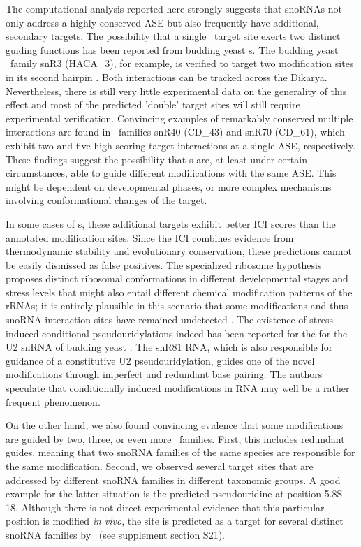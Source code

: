 The computational analysis reported here strongly suggests that
snoRNAs not only address a highly conserved ASE but also frequently
have additional, secondary targets. The possibility that a single
\sno\ target site exerts two distinct guiding functions has been
reported from budding yeast \haca s. The budding yeast \sno\ family
snR3 (HACA\_3), for example, is verified to target two modification
sites in its second hairpin \cite{Schattner:2004}.  Both interactions
can be tracked across the Dikarya.  Nevertheless, there is still very
little experimental data on the generality of this effect and most of
the predicted 'double' target sites will still require experimental
verification. Convincing examples of remarkably conserved multiple
interactions are found in \cd\ families snR40 (CD\_43) and snR70
(CD\_61), which exhibit two and five high-scoring target-interactions
at a single ASE, respectively.  These findings suggest the possibility
that \sno s are, at least under certain circumstances, able to guide
different modifications with the same ASE. This might be dependent on
developmental phases, or more complex mechanisms involving
conformational changes of the target.

In some cases of \haca s, these additional targets exhibit better ICI
scores than the annotated modification sites. Since the ICI combines
evidence from thermodynamic stability and evolutionary conservation, these
predictions cannot be easily dismissed as false positives. The specialized
ribosome hypothesis proposes distinct ribosomal conformations in different
developmental stages and stress levels that might also entail different
chemical modification patterns of the rRNAs; it is entirely plausible in
this scenario that some modifications and thus snoRNA interaction sites
have remained undetected \citep{Xue:2012}. The existence of
stress-induced conditional pseudouridylations indeed has been reported for
the for the U2 snRNA of budding yeast \cite{Wu:2011}. The snR81 RNA, which
is also responsible for guidance of a constitutive U2 pseudouridylation,
guides one of the novel modifications through imperfect and redundant base
pairing. The authors speculate that conditionally induced modifications in
RNA may well be a rather frequent phenomenon.

On the other hand, we also found convincing evidence that some
modifications are guided by two, three, or even more \sno\
families. First, this includes redundant guides, meaning that two
snoRNA families of the same species are responsible for the same
modification. Second, we observed several target sites that are
addressed by different snoRNA families in different taxonomic
groups. A good example for the latter situation is the predicted
pseudouridine at position 5.8S-18. Although there is not direct
experimental evidence that this particular position is modified
\emph{in vivo}, the site is predicted as a target for several distinct
snoRNA families by \snoop\ (see supplement section S21).

